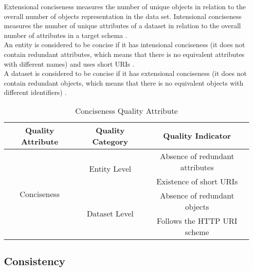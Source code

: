 \documentclass[onecolumn, crcready]{iosart2c}
\begin{document}
Extensional conciseness measures the number of unique objects in relation to the overall number of objects representation in the data set. Intensional conciseness measures the number of unique attributes of a dataset in relation to the overall number of attributes in a target schema \cite{ Bleiholder:2009}. \\ An entity is considered to be concise if it has intensional conciseness (it does not contain redundant attributes, which means that there is no equivalent attributes with different names) \cite{Mendes2012} and uses short URIs \cite{Framework2012}.\\ A dataset is considered to be concise if it has extensional conciseness (it does not contain redundant objects, which means that there is no equivalent objects with different identifiers) \cite{Mendes2012}.
\begin{table}[h]
\begin{tabular}{|c|c|c|}
\hline 
Quality Attribute & Quality Category & Quality Indicator\tabularnewline
\hline 
\hline 
\multirow{4}{*}{Conciseness} & \multirow{2}{*}{Entity Level} & Absence of redundant attributes\tabularnewline
\cline{3-3} 
 &  & Existence of short URIs\tabularnewline
\cline{2-3} 
 & \multirow{2}{*}{Dataset Level} & Absence of redundant objects\tabularnewline
\cline{3-3} 
 &  & Follows the HTTP URI scheme\tabularnewline
\hline 
\end{tabular}\caption{Conciseness Quality Attribute}


\end{table}

\subsection{Consistency}
\end{document}
